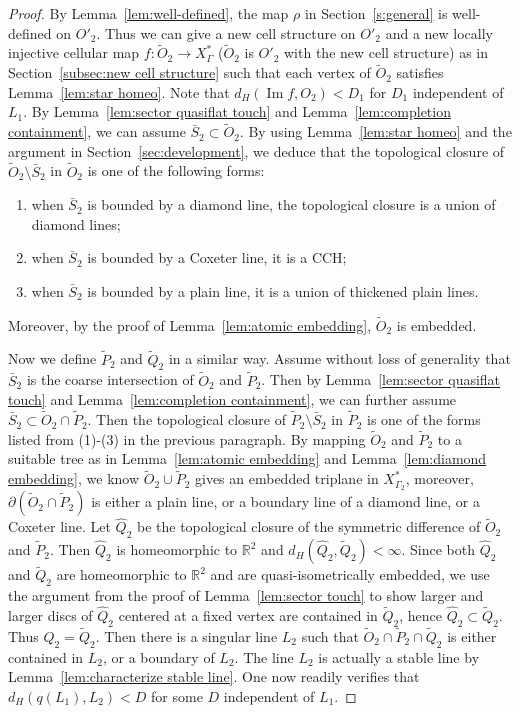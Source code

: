 \documentclass[11pt]{amsart}
\theoremstyle{definition}
\newcommand{\Xa}{X^{\ast}}
\newcommand{\im}{\operatorname{Im}}
\begin{document}
\begin{proof}
By Lemma~\ref{lem:well-defined}, the map $\rho$ in Section~\ref{s:general} is well-defined on $O'_2$. Thus we can give a new cell structure on $O'_2$ and a new locally injective cellular map $f\colon \widetilde O_2\to \Xa_{\Gamma}$ ($\widetilde O_2$ is $O'_2$ with the new cell structure) as in Section~\ref{subsec:new cell structure} such that each vertex of $\widetilde O_2$ satisfies Lemma~\ref{lem:star homeo}. Note that $d_H(\im f, O_2)<D_1$ for $D_1$ independent of $L_1$. By Lemma~\ref{lem:sector quasiflat touch} and Lemma~\ref{lem:completion containment}, we can assume $\bar S_2\subset \widetilde O_2$. By using Lemma~\ref{lem:star homeo} and the argument in Section~\ref{sec:development}, we deduce that the topological closure of $\widetilde O_2\setminus \bar S_2$ in $\widetilde O_2$ is one of the following forms:
\begin{enumerate}
	\item when $\bar S_2$ is bounded by a diamond line, the topological closure is a union of diamond lines;
	\item when $\bar S_2$ is bounded by a Coxeter line, it is a CCH;
	\item when $\bar S_2$ is bounded by a plain line, it is a union of thickened plain lines.
\end{enumerate}
Moreover, by the proof of Lemma~\ref{lem:atomic embedding}, $\widetilde O_2$ is embedded.

Now we define $\widetilde P_2$ and $\widetilde Q_2$ in a similar way. Assume without loss of generality that $\bar S_2$ is the coarse intersection of $\widetilde O_2$ and $\widetilde P_2$. Then by Lemma~\ref{lem:sector quasiflat touch} and Lemma~\ref{lem:completion containment}, we can further assume $\bar S_2\subset \widetilde O_2\cap\widetilde P_2$. Then the topological closure of $\widetilde P_2\setminus \bar S_2$ in $\widetilde P_2$ is one of the forms listed from (1)-(3) in the previous paragraph. By mapping $\widetilde O_2$ and $\widetilde P_2$ to a suitable tree as in Lemma~\ref{lem:atomic embedding} and Lemma~\ref{lem:diamond embedding}, we know $\widetilde O_2\cup\widetilde P_2$ gives an embedded triplane in $\Xa_{\Gamma_2}$, moreover, $\partial(\widetilde O_2\cap\widetilde P_2)$ is either a plain line, or a boundary line of a diamond line, or a Coxeter line. Let $\widehat Q_2$ be the topological closure of the symmetric difference of $\widetilde O_2$ and $\widetilde P_2$. Then $\widehat Q_2$ is homeomorphic to $\mathbb R^2$ and $d_H(\widehat Q_2,\widetilde Q_2)<\infty$. Since both $\widehat Q_2$ and $\widetilde Q_2$ are homeomorphic to $\mathbb R^2$ and are quasi-isometrically embedded, we use the argument from the proof of Lemma~\ref{lem:sector touch} to show larger and larger discs of $\widehat Q_2$ centered at a fixed vertex are contained in $\widetilde Q_2$, hence $\widehat Q_2\subset \widetilde Q_2$. Thus $\widehat Q_2=\widetilde Q_2$. Then there is a singular line $L_2$ such that $\widetilde O_2\cap\widetilde P_2\cap \widetilde Q_2$ is either contained in $L_2$, or a boundary of $L_2$. The line $L_2$ is actually a stable line by Lemma~\ref{lem:characterize stable line}. One now readily verifies that $d_H(q(L_1),L_2)<D$ for some $D$ independent of $L_1$. 
\end{proof}
\end{document}
